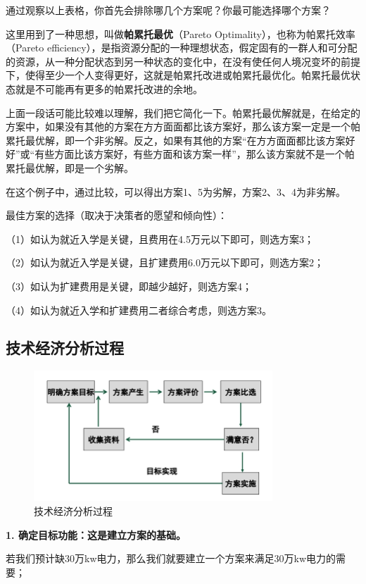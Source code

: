 通过观察以上表格，你首先会排除哪几个方案呢？你最可能选择哪个方案？

这里用到了一种思想，叫做\textbf{帕累托最优}（Pareto Optimality），也称为帕累托效率（Pareto efficiency），是指资源分配的一种理想状态，假定固有的一群人和可分配的资源，从一种分配状态到另一种状态的变化中，在没有使任何人境况变坏的前提下，使得至少一个人变得更好，这就是帕累托改进或帕累托最优化。帕累托最优状态就是不可能再有更多的帕累托改进的余地。

上面一段话可能比较难以理解，我们把它简化一下。帕累托最优解就是，在给定的方案中，如果没有其他的方案在方方面面都比该方案好，那么该方案一定是一个帕累托最优解，即一个非劣解。反之，如果有其他的方案“在方方面面都比该方案好好”或“有些方面比该方案好，有些方面和该方案一样”，那么该方案就不是一个帕累托最优解，即是一个劣解。

在这个例子中，通过比较，可以得出方案1、5为劣解，方案2、3、4为非劣解。

最佳方案的选择（取决于决策者的愿望和倾向性）：

（1）如认为就近入学是关键，且费用在4.5万元以下即可，则选方案3；

（2）如认为就近入学是关键，且扩建费用6.0万元以下即可，则选方案2；

（3）如认为扩建费用是关键，即越少越好，则选方案4；

（4）如认为就近入学和扩建费用二者综合考虑，则选方案3。

\subsection{技术经济分析过程}
\begin{figure}[H]
    \centering
    \includegraphics[width=0.8\textwidth]{image/微信截图_20241108214112.png}
    \caption{技术经济分析过程}
    \label{fig:3}
\end{figure}

\textbf{1. 确定目标功能：这是建立方案的基础。}

若我们预计缺30万kw电力，那么我们就要建立一个方案来满足30万kw电力的需要；

